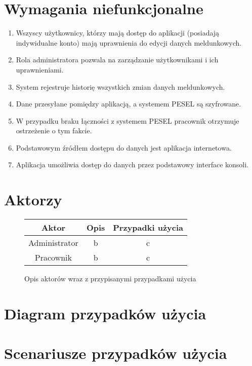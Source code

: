 \documentclass[12pt]{article}
\begin{document}
\section{Wymagania niefunkcjonalne}
\begin{enumerate}
    \item Wszyscy użytkownicy, którzy mają dostęp do aplikacji (posiadają indywidualne konto) mają uprawnienia do edycji danych meldunkowych.
    \item Rola administratora pozwala na zarządzanie użytkownikami i ich uprawnieniami.
    \item System rejestruje historię wszystkich zmian danych meldunkowych.
    \item Dane przesyłane pomiędzy aplikacją, a systemem PESEL są szyfrowane.
    \item W przypadku braku łączności z systemem PESEL pracownik otrzymuje ostrzeżenie o tym fakcie.
    \item Podstawowym źródłem dostępu do danych jest aplikacja internetowa.
    \item Aplikacja umożliwia dostęp do danych przez podstawowy interface konsoli.
\end{enumerate}
\newpage

\section{Aktorzy}

\begin{figure}[h]
    \centering
    \begin{tabular}{|c|c|c|}
        \hline
        \textbf{Aktor} & \textbf{Opis} & \textbf{Przypadki użycia} \\
        \hline
        Administrator & b & c \\
        \hline
        Pracownik & b & c \\
        \hline
    \end{tabular}
    \caption{Opis aktorów wraz z przypisanymi przypadkami użycia}
\end{figure}

\section{Diagram przypadków użycia}

\section{Scenariusze przypadków użycia}
\end{document}

